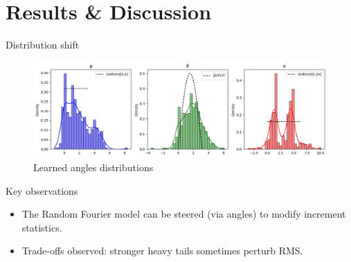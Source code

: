 \documentclass[11pt]{beamer}
\begin{document}
\section{Results \& Discussion}

\begin{frame}

\end{frame}

\begin{frame}{Distribution shift}
    \begin{figure}
        \centering
        \includegraphics[width=1\linewidth]{illustrations/AnglesDistributionLearned.png}
        \caption{Learned angles distributions}
    \end{figure}
\end{frame}

\begin{frame}{Key observations}
  \begin{itemize}
    \item The Random Fourier model can be steered (via angles) to modify increment statistics.
    \item Trade-offs observed: stronger heavy tails sometimes perturb RMS.
  \end{itemize}
\end{frame}
\end{document}
